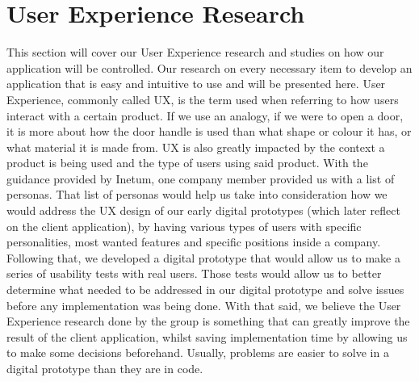 \documentclass[a4paper,twoside,10pt]{report}
\begin{document}
\chapter{User Experience Research}
This section will cover our User Experience research and studies on how our application will be controlled.
\newline
Our research on every necessary item to develop an application that is easy and intuitive to use and will be presented here.
\newline
User Experience, commonly called UX, is the term used when referring to how users interact with a certain product. If we use an analogy, if we were to open a door, it is more about how the door handle is used than what shape or colour it has, or what material it is made from. 
\newline
UX is also greatly impacted by the context a product is being used and the type of users using said product. With the guidance provided by Inetum, one company member provided us with a list of personas. That list of personas would help us take into consideration how we would address the UX design of our early digital prototypes (which later reflect on the client application), by having various types of users with specific personalities, most wanted features and specific positions inside a company. 
\newline
Following that, we developed a digital prototype that would allow us to make a series of usability tests with real users. Those tests would allow us to better determine what needed to be addressed in our digital prototype and solve issues before any implementation was being done.
\newline
With that said, we believe the User Experience research done by the group is something that can greatly improve the result of the client application, whilst saving implementation time by allowing us to make some decisions beforehand. Usually, problems are easier to solve in a digital prototype than they are in code.
\end{document}
